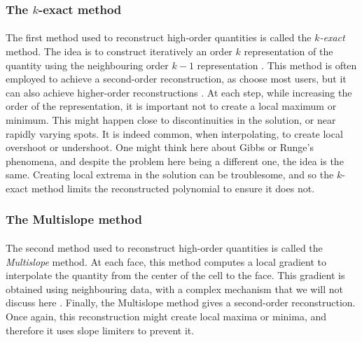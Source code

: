       \subsubsection{The $k$-exact method}

        \paragraph{}
        The first method used to reconstruct high-order quantities is called the \emph{$k$-exact} method.
        The idea is to construct iteratively an order $k$ representation of the quantity using the neighbouring order $k-1$ representation \cite{HaiderCroisilleCourbet2009}.
        This method is often employed to achieve a second-order reconstruction, as choose most users, but it can also achieve higher-order reconstructions \cite{HaiderCroisilleCourbet2011, HaiderCourbetCroisille2018, PontBrennerCinellaEtAl2017}.
        At each step, while increasing the order of the representation, it is important not to create a local maximum or minimum.
        This might happen close to discontinuities in the solution, or near rapidly varying spots.
        It is indeed common, when interpolating, to create local overshoot or undershoot.
        One might think here about Gibbs or Runge's phenomena, and despite the problem here being a different one, the idea is the same.
        Creating local extrema in the solution can be troublesome, and so the $k$-exact method limits the reconstructed polynomial to ensure it does not.


      \subsubsection{The Multislope method}

        \paragraph{}
        The second method used to reconstruct high-order quantities is called the \emph{Multislope} method.
        At each face, this method computes a local gradient to interpolate the quantity from the center of the cell to the face.
        This gradient is obtained using neighbouring data, with a complex mechanism that we will not discuss here \cite{LeTouzeMurroneGuillard2015}.
        Finally, the Multislope method gives a second-order reconstruction.
        Once again, this reconstruction might create local maxima or minima, and therefore it uses slope limiters \cite{Venkatakrishnan1993, BergerAftosmis2005} to prevent it.


